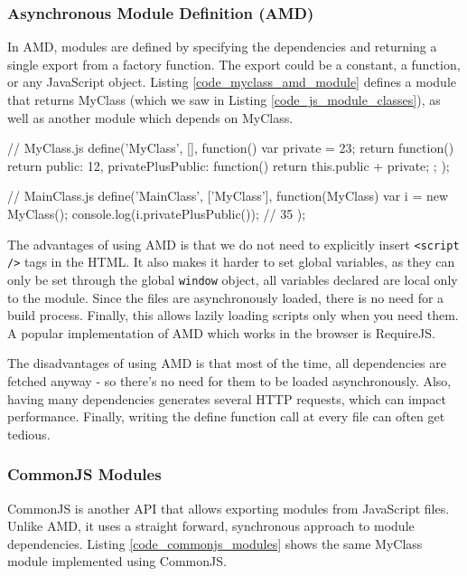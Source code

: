 \subsubsection{Asynchronous Module Definition (AMD)} %
\label{ssub:asynchronous_module_definition_}
In AMD, modules are defined by specifying the dependencies and returning a single export from a factory function. The export could be a constant, a function, or any JavaScript object. Listing \ref{code_myclass_amd_module} defines a module that returns MyClass (which we saw in Listing \ref{code_js_module_classes}), as well as another module which depends on MyClass. 

\begin{code}
// MyClass.js
define('MyClass', [], function(){
  var private = 23;
  return function(){
    return {
      public: 12,
      privatePlusPublic: function(){
        return this.public + private;
      }
    }
  };
});

// MainClass.js
define('MainClass', ['MyClass'], function(MyClass){
  var i = new MyClass();
  console.log(i.privatePlusPublic()); // 35
});
\end{code}

The advantages of using AMD is that we do not need to explicitly insert \lstinline{<script />} tags in the HTML. It also makes it harder to set global variables, as they can only be set through the global \lstinline{window} object, all variables declared are local only to the module. Since the files are asynchronously loaded, there is no need for a build process. Finally, this allows lazily loading scripts only when you need them.
A popular implementation of AMD which works in the browser is RequireJS. 

The disadvantages of using AMD is that most of the time, all dependencies are fetched anyway - so there's no need for them to be loaded asynchronously. Also, having many dependencies generates several HTTP requests, which can impact performance. Finally, writing the define function call at every file can often get tedious.

\subsubsection{CommonJS Modules} %
\label{ssub:commonjs_modules}
CommonJS is another API that allows exporting modules from JavaScript files. Unlike AMD, it uses a straight forward, synchronous approach to module dependencies. Listing \ref{code_commonjs_modules} shows the same MyClass module implemented using CommonJS.

